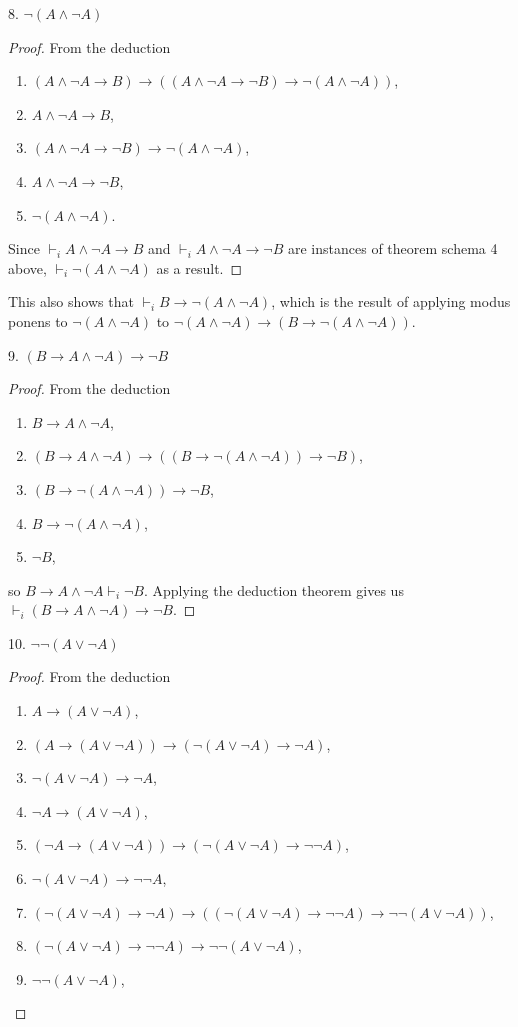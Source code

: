 \documentclass[12pt]{article}
\begin{document}
8. $\neg (A \land \neg A)$
\begin{proof} From the deduction
\begin{enumerate}
\item $(A\land \neg A\to B) \to ((A\land \neg A\to \neg B)\to \neg (A\land \neg A))$,
\item $A\land \neg A\to B$,
\item $(A\land \neg A\to \neg B)\to \neg (A\land \neg A)$,
\item $A\land \neg A\to \neg B$,
\item $\neg (A\land \neg A)$.
\end{enumerate}
Since $\vdash_i A\land \neg A\to B$ and $\vdash_i A\land \neg A\to \neg B$ are instances of theorem schema 4 above, $\vdash_i \neg (A\land \neg A)$ as a result.
\end{proof}
This also shows that $\vdash_i B \to \neg (A\land \neg A)$, which is the result of applying modus ponens to $\neg (A \land \neg A)$ to $\neg (A \land \neg A) \to (B \to \neg (A\land \neg A))$.

9. $(B \to A\land \neg A)\to \neg B$
\begin{proof} From the deduction
\begin{enumerate}
\item $B \to A\land \neg A$,
\item $(B \to A\land \neg A)\to ((B \to \neg (A\land \neg A))\to \neg B)$,
\item $(B \to \neg (A\land \neg A))\to \neg B$,
\item $B \to \neg (A\land \neg A)$,
\item $\neg B$,
\end{enumerate}
so $B \to A\land \neg A \vdash_i \neg B$.  Applying the deduction theorem gives us $\vdash_i (B \to A\land \neg A)
 \to \neg B$.
\end{proof}

10. $\neg \neg (A \lor \neg A)$
\begin{proof} From the deduction
\begin{enumerate}
\item $A \to (A\lor \neg A)$,
\item $(A \to (A\lor \neg A)) \to (\neg (A \lor \neg A) \to \neg A)$,
\item $\neg (A \lor \neg A) \to \neg A$,
\item $\neg A \to (A \lor \neg A)$,
\item $(\neg A \to (A\lor \neg A)) \to (\neg (A \lor \neg A) \to \neg \neg A)$,
\item $\neg (A \lor \neg A) \to \neg \neg A$,
\item $(\neg (A \lor \neg A) \to \neg A) \to ((\neg (A \lor \neg A) \to \neg \neg A) \to \neg \neg (A \lor \neg A))$,
\item $(\neg (A \lor \neg A) \to \neg \neg A) \to \neg \neg (A \lor \neg A)$,
\item $\neg \neg (A \lor \neg A)$,
\end{enumerate}
\end{proof}
\end{document}
